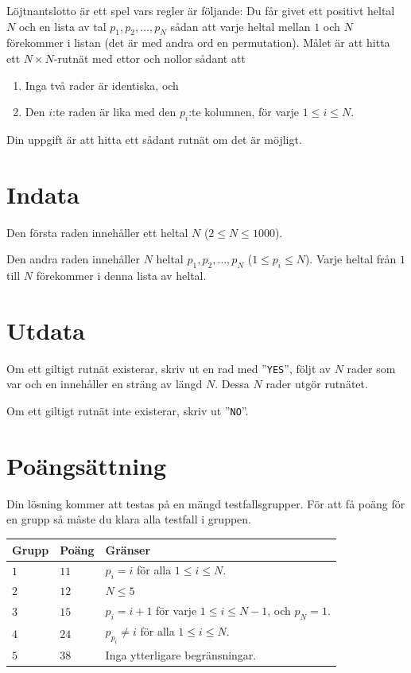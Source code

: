 \noindent

Löjtnantslotto är ett spel vars regler är följande:
Du får givet ett positivt heltal $N$ och en lista av tal $p_1, p_2, \dots, p_N$ sådan att varje heltal mellan 
$1$ och $N$ förekommer i listan (det är med andra ord en permutation). Målet är att hitta ett $N \times N$-rutnät
med ettor och nollor sådant att
\begin{enumerate}
  \item Inga två rader är identiska, och 
  \item Den $i$:te raden är lika med den $p_i$:te kolumnen, för varje $1 \leq i \leq N$.
\end{enumerate}

Din uppgift är att hitta ett sådant rutnät om det är möjligt.


\section*{Indata}

Den första raden innehåller ett heltal $N$ ($2 \leq N \leq 1000$).

Den andra raden innehåller $N$ heltal $p_1, p_2, \dots, p_N$ ($1 \leq p_i \leq N$). Varje heltal från $1$ till $N$
förekommer i denna lista av heltal.

\section*{Utdata}

Om ett giltigt rutnät existerar, skriv ut en rad med ''\texttt{YES}'', följt av $N$ rader som var och en innehåller 
en sträng av längd $N$. Dessa $N$ rader utgör rutnätet.

Om ett giltigt rutnät inte existerar, skriv ut ''\texttt{NO}''.


\section*{Poängsättning}
Din lösning kommer att testas på en mängd testfallsgrupper.
För att få poäng för en grupp så måste du klara alla testfall i gruppen.

\noindent
\begin{tabular}{| l | l | p{12cm} |}
  \hline
  \textbf{Grupp} & \textbf{Poäng} & \textbf{Gränser} \\ \hline
  $1$    & $11$       & $p_i = i$ för alla $1 \leq i \leq N$. \\ \hline
  $2$    & $12$       & $N \leq 5$ \\ \hline
  $3$    & $15$       & $p_i = i+1$ för varje $1 \leq i \leq N-1$, och $p_N = 1$.  \\ \hline
  $4$    & $24$       & $p_{p_i} \neq i$ för alla $1 \leq i \leq N$. \\ \hline
  $5$    & $38$       & Inga ytterligare begränsningar.  \\ \hline
\end{tabular}

